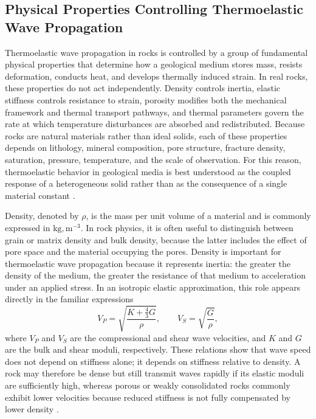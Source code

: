 \subsection{Physical Properties Controlling Thermoelastic Wave Propagation}

Thermoelastic wave propagation in rocks is controlled by a group of fundamental physical properties that determine how a geological medium stores mass, resists deformation, conducts heat, and develops thermally induced strain. In real rocks, these properties do not act independently. Density controls inertia, elastic stiffness controls resistance to strain, porosity modifies both the mechanical framework and thermal transport pathways, and thermal parameters govern the rate at which temperature disturbances are absorbed and redistributed. Because rocks are natural materials rather than ideal solids, each of these properties depends on lithology, mineral composition, pore structure, fracture density, saturation, pressure, temperature, and the scale of observation. For this reason, thermoelastic behavior in geological media is best understood as the coupled response of a heterogeneous solid rather than as the consequence of a single material constant \cite{mavko2009,jaeger2007,robertson1988,turcotte2014}. %

Density, denoted by $\rho$, is the mass per unit volume of a material and is commonly expressed in $\mathrm{kg,m^{-3}}$. In rock physics, it is often useful to distinguish between grain or matrix density and bulk density, because the latter includes the effect of pore space and the material occupying the pores. Density is important for thermoelastic wave propagation because it represents inertia: the greater the density of the medium, the greater the resistance of that medium to acceleration under an applied stress. In an isotropic elastic approximation, this role appears directly in the familiar expressions \[ V_P=\sqrt{\frac{K+\frac{4}{3}G}{\rho}}, \qquad V_S=\sqrt{\frac{G}{\rho}}, \] where $V_P$ and $V_S$ are the compressional and shear wave velocities, and $K$ and $G$ are the bulk and shear moduli, respectively. These relations show that wave speed does not depend on stiffness alone; it depends on stiffness relative to density. A rock may therefore be dense but still transmit waves rapidly if its elastic moduli are sufficiently high, whereas porous or weakly consolidated rocks commonly exhibit lower velocities because reduced stiffness is not fully compensated by lower density \cite{aki2002,mavko2009}. %

